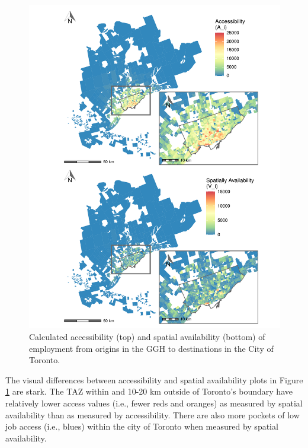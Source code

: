 \documentclass[]{elsarticle} %
\begin{document}
\begin{figure}
\includegraphics[width=1\linewidth]{Spatial-Availability_files/figure-latex/plot-access-SA-Toronto-TTS-1} \caption{\label{fig:plot-access-SA-Toronto-TTS}Calculated accessibility (top) and spatial availability (bottom) of employment from origins in the GGH to destinations in the City of Toronto.}\label{fig:plot-access-SA-Toronto-TTS}
\end{figure}

\newpage

The visual differences between accessibility and spatial availability
plots in Figure \ref{fig:plot-access-SA-Toronto-TTS} are stark. The TAZ
within and 10-20 km outside of Toronto's boundary have relatively lower
access values (i.e., fewer reds and oranges) as measured by spatial
availability than as measured by accessibility. There are also more
pockets of low job access (i.e., blues) within the city of Toronto when
measured by spatial availability.
\end{document}

